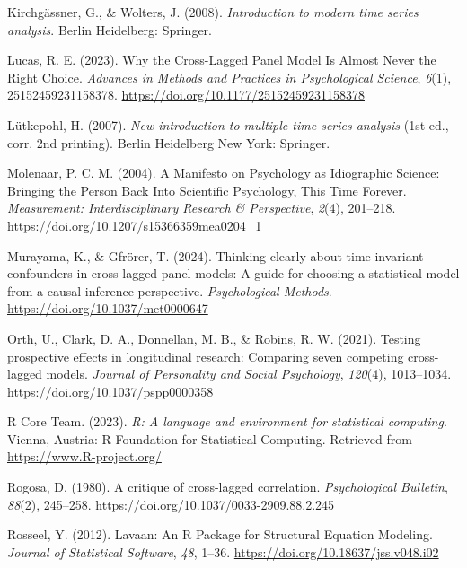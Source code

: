 \documentclass[
  man,
  floatsintext,
  longtable,
  nolmodern,
  notxfonts,
  notimes,
  colorlinks=true,linkcolor=blue,citecolor=blue,urlcolor=blue]{apa7}
\newlength{\cslhangindent}
\newenvironment{CSLReferences}[2] %
 {\begin{list}{}{%
  \setlength{\itemindent}{0pt}
  \setlength{\leftmargin}{0pt}
  \setlength{\parsep}{0pt}
  \ifodd #1
   \setlength{\leftmargin}{\cslhangindent}
   \setlength{\itemindent}{-1\cslhangindent}
  \fi
  \setlength{\itemsep}{#2\baselineskip}}}
 {\end{list}}
\begin{document}
\begin{CSLReferences}{1}{0}
Kirchgässner, G., \& Wolters, J. (2008). \emph{Introduction to modern
time series analysis}. Berlin Heidelberg: Springer.

Lucas, R. E. (2023). Why the {Cross-Lagged Panel Model Is Almost Never}
the {Right Choice}. \emph{Advances in Methods and Practices in
Psychological Science}, \emph{6}(1), 25152459231158378.
\url{https://doi.org/10.1177/25152459231158378}

Lütkepohl, H. (2007). \emph{New introduction to multiple time series
analysis} (1st ed., corr. 2nd printing). Berlin Heidelberg New York:
Springer.

Molenaar, P. C. M. (2004). A {Manifesto} on {Psychology} as {Idiographic
Science}: {Bringing} the {Person Back Into Scientific Psychology}, {This
Time Forever}. \emph{Measurement: Interdisciplinary Research \&
Perspective}, \emph{2}(4), 201--218.
\url{https://doi.org/10.1207/s15366359mea0204_1}

Murayama, K., \& Gfrörer, T. (2024). Thinking clearly about
time-invariant confounders in cross-lagged panel models: {A} guide for
choosing a statistical model from a causal inference perspective.
\emph{Psychological Methods}. \url{https://doi.org/10.1037/met0000647}

Orth, U., Clark, D. A., Donnellan, M. B., \& Robins, R. W. (2021).
Testing prospective effects in longitudinal research: {Comparing} seven
competing cross-lagged models. \emph{Journal of Personality and Social
Psychology}, \emph{120}(4), 1013--1034.
\url{https://doi.org/10.1037/pspp0000358}

R Core Team. (2023). \emph{R: A language and environment for statistical
computing}. Vienna, Austria: R Foundation for Statistical Computing.
Retrieved from \url{https://www.R-project.org/}

Rogosa, D. (1980). A critique of cross-lagged correlation.
\emph{Psychological Bulletin}, \emph{88}(2), 245--258.
\url{https://doi.org/10.1037/0033-2909.88.2.245}

Rosseel, Y. (2012). Lavaan: {An R Package} for {Structural Equation
Modeling}. \emph{Journal of Statistical Software}, \emph{48}, 1--36.
\url{https://doi.org/10.18637/jss.v048.i02}


\end{CSLReferences}
\end{document}
